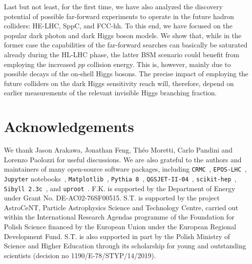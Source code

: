 \documentclass[prd,twocolumn,reprint,preprintnumbers,nofootinbib]{revtex4-1}
\begin{document}
Last but not least, for the first time, we have also analyzed the discovery potential of possible far-forward experiments to operate in the future hadron colliders: HE-LHC, SppC, and FCC-hh. To this end, we have focused on the popular dark photon and dark Higgs boson models. We show that, while in the former case the capabilities of the far-forward searches can basically be saturated already during the HL-LHC phase, the latter BSM scenario could benefit from employing the increased $pp$ collision energy. This is, however, mainly due to possible decays of the on-shell Higgs bosons. The precise impact of employing the future colliders on the dark Higgs sensitivity reach will, therefore, depend on earlier measurements of the relevant invisible Higgs branching fraction.

\section*{Acknowledgements}

We thank Jason Arakawa, Jonathan Feng, Théo Moretti, Carlo Pandini and Lorenzo Paolozzi for useful discussions.  We are also grateful to the authors and maintainers of many open-source software packages, including
\texttt{CRMC}~\cite{CRMC},
\texttt{EPOS-LHC}~\cite{Pierog:2013ria},
\texttt{Jupyter} notebooks~\cite{soton403913}, 
\texttt{Matplotlib}~\cite{Hunter:2007}, 
\texttt{Pythia~8}~\cite{Sjostrand:2014zea},
\texttt{QGSJET-II-04}~\cite{Ostapchenko:2010vb},
\texttt{scikit-hep}~\cite{Rodrigues:2019nct}, 
\texttt{Sibyll~2.3c}~\cite{Ahn:2009wx,Riehn:2015oba}, and
\texttt{uproot}~\cite{jim_pivarski_2019_3256257}.
F.K. is supported by the Department of Energy under Grant No. DE-AC02-76SF00515. S.T. is supported by the project AstroCeNT, Particle Astrophysics Science and Technology Centre, carried out within the International Research Agendas programme of the Foundation for Polish Science financed by the European Union under the European Regional Development Fund. S.T. is also supported in part by the Polish Ministry of Science and Higher Education through its scholarship for young and outstanding scientists (decision no 1190/E-78/STYP/14/2019).




\end{document}
